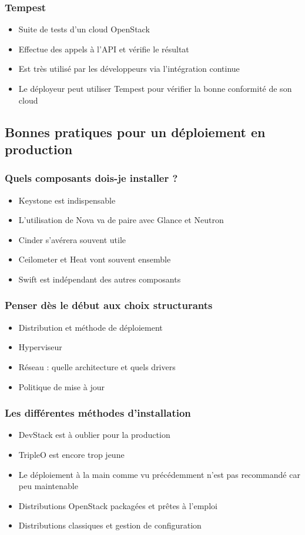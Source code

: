   \begin{frame}
    \frametitle{Tempest}
    \begin{itemize}
      \item Suite de tests d'un cloud OpenStack
      \item Effectue des appels à l'API et vérifie le résultat
      \item Est très utilisé par les développeurs via l'intégration continue
      \item Le déployeur peut utiliser Tempest pour vérifier la bonne conformité de son cloud
    \end{itemize}
  \end{frame}

  \subsection[Déployer en production]{Bonnes pratiques pour un déploiement en production}

  \begin{frame}
    \frametitle{Quels composants dois-je installer ?}
      \begin{itemize}
        \item Keystone est indispensable
        \item L'utilisation de Nova va de paire avec Glance et Neutron
        \item Cinder s'avérera souvent utile
        \item Ceilometer et Heat vont souvent ensemble
        \item Swift est indépendant des autres composants
      \end{itemize}
  \end{frame}

  \begin{frame}
    \frametitle{Penser dès le début aux choix structurants}
    \begin{itemize}
      \item Distribution et méthode de déploiement
      \item Hyperviseur
      \item Réseau : quelle architecture et quels drivers
      \item Politique de mise à jour
    \end{itemize}
  \end{frame}

  \begin{frame}
    \frametitle{Les différentes méthodes d'installation}
    \begin{itemize}
      \item DevStack est à oublier pour la production
      \item TripleO est encore trop jeune
      \item Le déploiement à la main comme vu précédemment n'est pas recommandé car peu maintenable
      \item Distributions OpenStack packagées et prêtes à l'emploi
      \item Distributions classiques et gestion de configuration
    \end{itemize}
  \end{frame}

